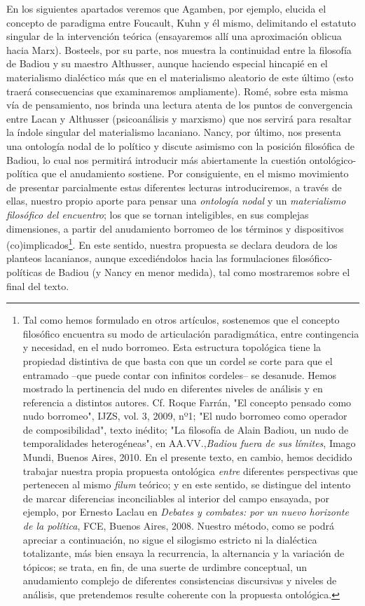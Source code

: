 En los siguientes apartados veremos que Agamben, por ejemplo, elucida el
concepto de paradigma entre Foucault, Kuhn y él mismo, delimitando el
estatuto singular de la intervención teórica (ensayaremos allí una
aproximación oblicua hacia Marx). Bosteels, por su parte, nos muestra la
continuidad entre la filosofía de Badiou y su maestro Althusser, aunque
haciendo especial hincapié en el materialismo dialéctico más que en el
materialismo aleatorio de este último (esto traerá consecuencias que
examinaremos ampliamente). Romé, sobre esta misma vía de pensamiento,
nos brinda una lectura atenta de los puntos de convergencia entre Lacan
y Althusser (psicoanálisis y marxismo) que nos servirá para resaltar la
índole singular del materialismo lacaniano. Nancy, por último, nos
presenta una ontología nodal de lo político y discute asimismo con la
posición filosófica de Badiou, lo cual nos permitirá introducir más
abiertamente la cuestión ontológico-política que el anudamiento
sostiene. Por consiguiente, en el mismo movimiento de presentar
parcialmente estas diferentes lecturas introduciremos, a través de
ellas, nuestro propio aporte para pensar una \emph{ontología nodal} y un
\emph{materialismo filosófico del encuentro}; los que se tornan
inteligibles, en sus complejas dimensiones, a partir del anudamiento
borromeo de los términos y dispositivos (co)implicados\footnote{Tal como
  hemos formulado en otros artículos, sostenemos que el concepto
  filosófico encuentra su modo de articulación paradigmática, entre
  contingencia y necesidad, en el nudo borromeo. Esta estructura
  topológica tiene la propiedad distintiva de que basta con que un
  cordel se corte para que el entramado --que puede contar con infinitos
  cordeles-- se desanude. Hemos mostrado la pertinencia del nudo en
  diferentes niveles de análisis y en referencia a distintos autores.
  Cf. Roque Farrán, "El concepto pensado como nudo borromeo", IJZS, vol.
  3, 2009, nº1; "El nudo borromeo como operador de composibilidad",
  texto inédito; "La filosofía de Alain Badiou, un nudo de
  temporalidades heterogéneas", en AA.VV.,\emph{Badiou fuera de sus
  límites}, Imago Mundi, Buenos Aires, 2010. En el presente texto, en
  cambio, hemos decidido trabajar nuestra propia propuesta ontológica
  \emph{entre} diferentes perspectivas que pertenecen al mismo
  \emph{filum} teórico; y en este sentido, se distingue del intento de
  marcar diferencias inconciliables al interior del campo ensayada, por
  ejemplo, por Ernesto Laclau en \emph{Debates y combates: por un nuevo
  horizonte de la política}, FCE, Buenos Aires, 2008. Nuestro método,
  como se podrá apreciar a continuación, no sigue el silogismo estricto
  ni la dialéctica totalizante, más bien ensaya la recurrencia, la
  alternancia y la variación de tópicos; se trata, en fin, de una suerte
  de urdimbre conceptual, un anudamiento complejo de diferentes
  consistencias discursivas y niveles de análisis, que pretendemos
  resulte coherente con la propuesta ontológica.}. En este sentido,
nuestra propuesta se declara deudora de los planteos lacanianos, aunque
excediéndolos hacia las formulaciones filosófico-políticas de Badiou (y
Nancy en menor medida), tal como mostraremos sobre el final del texto.

